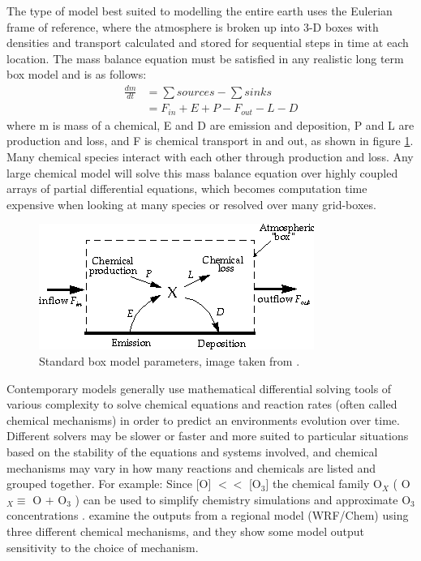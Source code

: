   
  The type of model best suited to modelling the entire earth uses the Eulerian frame of reference, where the atmosphere is broken up into 3-D boxes with densities and transport calculated and stored for sequential steps in time at each location.
  The mass balance equation must be satisfied in any realistic long term box model and is as follows: 
  \begin{align*}
    \frac{dm}{dt} & = \sum{sources}-\sum{sinks} \\
                  & = F_{in} + E + P - F_{out} - L - D 
  \end{align*}
  where m is mass of a chemical, E and D are emission and deposition, P and L are production and loss, and F is chemical transport in and out, as shown in figure \ref{LR:Models:fig_boxmodel}.
  Many chemical species interact with each other through production and loss. 
  Any large chemical model will solve this mass balance equation over highly coupled arrays of partial differential equations, which becomes computation time expensive when looking at many species or resolved over many grid-boxes.
  
  \begin{figure}
    \includegraphics{Figures/boxmodel.png}
    \caption{ %
      Standard box model parameters, image taken from \textcite{Jacob_1999_book}. }
    \label{LR:Models:fig_boxmodel}
  \end{figure}
  
  
  Contemporary models generally use mathematical differential solving tools of various complexity to solve chemical equations and reaction rates (often called chemical mechanisms) in order to predict an environments evolution over time.
  Different solvers may be slower or faster and more suited to particular situations based on the stability of the equations and systems involved, and chemical mechanisms may vary in how many reactions and chemicals are listed and grouped together.
  For example: Since [O] $<<$ [O$_3$] the chemical family O$_X$ (  O$_X \equiv $ O $+$ O$_3$ ) can be used to simplify chemistry simulations and approximate O$_3$ concentrations \parencite[][Chapter 3]{BrasseurJacob2017}.
  \textcite{Zhang2012} examine the outputs from a regional model (WRF/Chem) using three different chemical mechanisms, and they show some model output sensitivity to the choice of mechanism.
  
